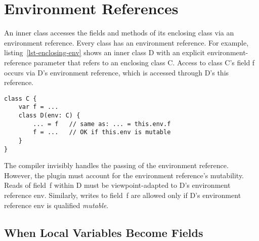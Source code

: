 \begin{comment}
\begin{lstlisting}[caption={An Iterator over a Collection},float={htp},label={lst-iterator}]
class List[T](env: @readonly) {
	val head: T
	val tail: List[T]
	
	class Iterator(env: @readonly) {
		var current = List.this    // List.this == Iterator.env
		def next(this: @*@mutEnv[Iterator]*@): T = {
			val t = current.head     // `unsafe' viewpoint adaptation
			current = current.tail
			t
		}
	}
}
val ls_r = new List[@readonly]
val ls_m = new List[@mutable]
val it_r = new ls_r.Iterator   // produces an Iterator over @readonly
val it_m = new ls_m.Iterator   // produces an Iterator over @mutable
... = it_r.next                // produces a @readonly element
... = it_m.next                // produces a @mutable element
\end{lstlisting}
\end{comment}

\section{Environment References} \label{sec-env-ref}

An inner class accesses the fields and methods of its enclosing class via
an environment reference.
Every class has an environment reference.
For example, listing~\ref{lst-enclosing-env} shows
an inner class {\cd D} with an explicit environment-reference parameter
that refers to an enclosing class {\cd C}.
Access to class {\cd C}'s field {\cd f} occurs via {\cd D}'s environment reference,
which is accessed through {\cd D}'s {\cd this} reference.
\begin{lstlisting}[caption={Accessing an Enclosing Environment},float={htp},label={lst-enclosing-env}]
class C {
	var f = ...
	class D(env: C) {
		... = f   // same as: ... = this.env.f
		f = ...   // OK if this.env is mutable
	}
}
\end{lstlisting}

The compiler invisibly handles the passing of the environment reference.
However, the plugin must account for the environment reference's mutability.
Reads of field~{\cd f} within {\cd D} must be viewpoint-adapted to
{\cd D}'s environment reference {\cd env}.
Similarly, writes to field~{\cd f} are allowed only if {\cd D}'s environment
reference {\cd env} is qualified {\em mutable}.

\subsection{When Local Variables Become Fields}
\label{sec-local-fields}

